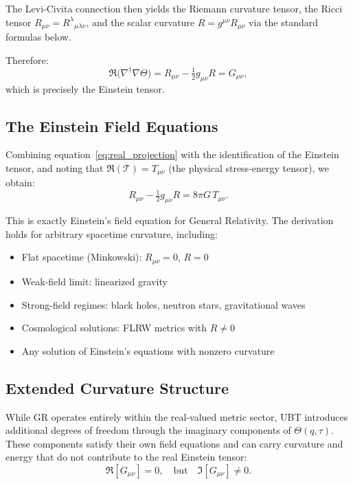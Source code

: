 The Levi-Civita connection then yields the Riemann curvature tensor, the Ricci tensor
$R_{\mu\nu} = R^\lambda{}_{\mu\lambda\nu}$, and the scalar curvature $R = g^{\mu\nu} R_{\mu\nu}$
via the standard formulas below.

Therefore:
\begin{equation}
\Re\big(\nabla^\dagger \nabla \Theta\big) = R_{\mu\nu} - \tfrac{1}{2} g_{\mu\nu} R = G_{\mu\nu},
\label{eq:real_projection}
\end{equation}
which is precisely the Einstein tensor.

\subsection{The Einstein Field Equations}

Combining equation~\eqref{eq:real_projection} with the identification of the Einstein tensor, and noting that $\Re(\mathcal{T}) = T_{\mu\nu}$ (the physical stress-energy tensor), we obtain:
\begin{equation}
R_{\mu\nu} - \tfrac{1}{2} g_{\mu\nu} R = 8 \pi G \, T_{\mu\nu}.
\label{eq:einstein_equations}
\end{equation}

This is exactly Einstein's field equation for General Relativity. The derivation holds for arbitrary spacetime curvature, including:
\begin{itemize}
  \item Flat spacetime (Minkowski): $R_{\mu\nu} = 0$, $R = 0$
  \item Weak-field limit: linearized gravity
  \item Strong-field regimes: black holes, neutron stars, gravitational waves
  \item Cosmological solutions: FLRW metrics with $R \neq 0$
  \item Any solution of Einstein's equations with nonzero curvature
\end{itemize}

\subsection{Extended Curvature Structure}

While GR operates entirely within the real-valued metric sector, UBT introduces additional degrees of freedom through the imaginary components of $\Theta(q,\tau)$. These components satisfy their own field equations and can carry curvature and energy that do not contribute to the real Einstein tensor:
\begin{equation}
\Re[G_{\mu\nu}] = 0, \quad \text{but} \quad \Im[G_{\mu\nu}] \neq 0.
\end{equation}

